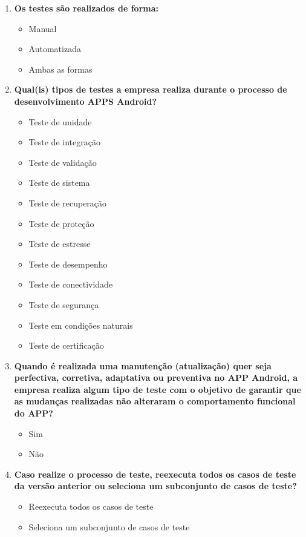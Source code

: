 \begin{enumerate}[label=\bf A\arabic*,leftmargin=1.8cm]
\begin{enumerate}[label= \arabic*]
    \item \textbf{Os testes são realizados de forma:}
     \begin{itemize}
        \item Manual
        \item Automatizada
        \item Ambas as formas
     \end{itemize}
    
    \item \textbf{Qual(is) tipos de testes a empresa realiza durante o processo de desenvolvimento \ac{APPS} Android?}
    \begin{itemize}
        \item Teste de unidade
        \item Teste de integração
        \item Teste de validação
        \item Teste de sistema
        \item Teste de recuperação
        \item Teste de proteção
        \item Teste de estresse
        \item Teste de desempenho
        \item Teste de conectividade
        \item Teste de segurança
        \item Teste em condições naturais
        \item Teste de certificação
    \end{itemize}
     
     \item \textbf{Quando é realizada uma manutenção (atualização) quer seja perfectiva, corretiva, adaptativa ou preventiva no APP Android, a empresa realiza algum tipo de teste com o objetivo de garantir que as mudanças realizadas não alteraram o comportamento funcional do APP?}
     \begin{itemize}
         \item Sim
         \item Não
     \end{itemize}
     
    \item \textbf{Caso realize o processo de teste, reexecuta todos os casos de teste da versão anterior ou seleciona um subconjunto de casos de teste?}
     \begin{itemize}
         \item Reexecuta todos os casos de teste
         \item Seleciona um subconjunto de casos de teste
     \end{itemize}
     

\end{enumerate}
\end{enumerate}
